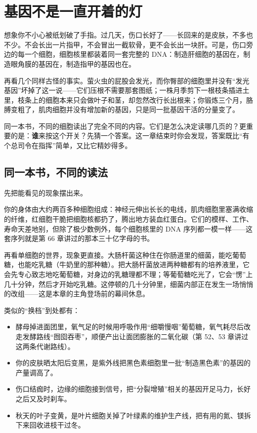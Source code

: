 \chapter{基因不是一直开着的灯}

\begin{kaichang}
想象你不小心被纸划破了手指。过几天，伤口长好了——长回来的是皮肤，不多也不少。不会长出一片指甲，不会冒出一截软骨，更不会长出一块肝。可是，伤口旁边的每一个细胞，细胞核里都装着同一套完整的 DNA：制造肝细胞的基因在，制造眼角膜的基因在，制造指甲的基因也在。

再看几个同样古怪的事实。萤火虫的屁股会发光，而你臀部的细胞里并没有“发光基因”坏掉了这一说——它们压根不需要那套图纸；一株月季剪下一根枝条插进土里，枝条上的细胞本来只会做叶子和茎，却忽然改行长出根来；你锻炼三个月，胳膊变粗了，肌肉细胞并没有增加新的基因，只是同一批基因干活的分量变了。

同一本书，不同的细胞读出了完全不同的内容。它们是怎么决定读哪几页的？更重要的是：\textbf{谁}来按这个开关？先猜一个答案。这一章结束时你会发现，答案既比“有个总司令在指挥”简单，又比它精妙得多。
\end{kaichang}

\section{同一本书，不同的读法}

先把能看见的现象摆出来。

你的身体由大约两百多种细胞组成：神经元伸出长长的电线，肌肉细胞里塞满收缩的纤维，红细胞干脆把细胞核都扔了，腾出地方装血红蛋白。它们的模样、工作、寿命天差地别，但除了极少数例外，每个细胞核里的 DNA 序列都一模一样——这套序列就是第 66 章讲过的那本三十亿字母的书。

再看单细胞的世界，现象更直接。大肠杆菌这种住在你肠道里的细菌，能吃葡萄糖，也能吃乳糖（牛奶里的那种糖）。把大肠杆菌放进两种糖都有的培养液里，它会先专心致志地吃葡萄糖，对身边的乳糖理都不理；等葡萄糖吃光了，它会“愣”上几十分钟，然后才开始吃乳糖。这停顿的几十分钟里，细菌内部正在发生一场悄悄的改组——这是本章的主角登场前的幕间休息。

类似的“换档”到处都有：

\begin{itemize}[itemsep=2pt]
\item 酵母掉进面团里，氧气足的时候用呼吸作用“细嚼慢咽”葡萄糖，氧气耗尽后改走发酵路线“囫囵吞枣”，顺便产出让面团膨胀的二氧化碳（第 52、53 章讲过这两条代谢路线）。
\item 你的皮肤晒太阳后变黑，是紫外线把黑色素细胞里一批“制造黑色素”的基因的产量调高了。
\item 伤口结痂时，边缘的细胞接到信号，把“分裂增殖”相关的基因开足马力，长好之后又及时刹车。
\item 秋天的叶子变黄，是叶片细胞关掉了叶绿素的维护生产线，把有用的氮、镁拆下来回收进枝干过冬。
\end{itemize}

